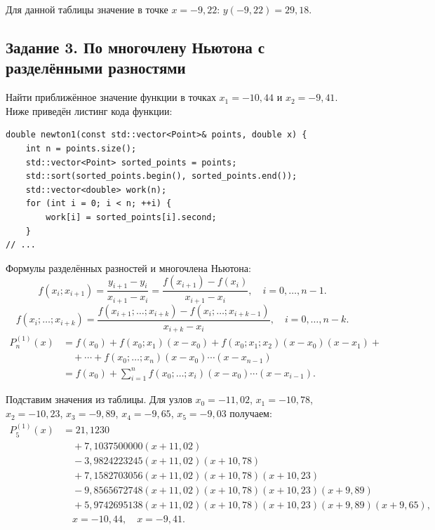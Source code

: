 \documentclass[14pt,a4paper]{extarticle}
\begin{document}
	Для данной таблицы значение в точке $x= -9,22$: $y(-9,22) = 29,18$.
	
	\subsection{Задание 3. По многочлену Ньютона с разделёнными разностями}
	Найти приближённое значение функции в точках $x_1= -10,44$ и $x_2= -9,41$. Ниже приведён листинг кода функции:
	
	\begin{lstlisting}
double newton1(const std::vector<Point>& points, double x) {
	int n = points.size();
	std::vector<Point> sorted_points = points;
	std::sort(sorted_points.begin(), sorted_points.end());
	std::vector<double> work(n);
	for (int i = 0; i < n; ++i) {
		work[i] = sorted_points[i].second;
	}
// ...
	\end{lstlisting}
	
	\noindent Формулы разделённых разностей и многочлена Ньютона:
	\[
		f(x_i;x_{i+1})=\dfrac{y_{i+1}-y_i}{x_{i+1}-x_i}
		=\dfrac{f(x_{i+1})-f(x_i)}{x_{i+1}-x_i},
		\quad i=0,\ldots,n-1.
	\]
	\[
		f(x_i;\ldots;x_{i+k})=
		\dfrac{f(x_{i+1};\ldots;x_{i+k})-f(x_i;\ldots;x_{i+k-1})}{x_{i+k}-x_i},
		\quad i=0,\ldots,n-k.
	\]
	\begingroup\small
	\begin{align*}
		P_n^{(1)}(x)
		&=f(x_0)+f(x_0;x_1)(x-x_0)
		+f(x_0;x_1;x_2)(x-x_0)(x-x_1)+\\
		&\quad+\cdots+f(x_0;\ldots;x_n)(x-x_0)\cdots(x-x_{n-1})\\
		&=f(x_0)+\sum_{i=1}^{n} f(x_0;\ldots;x_i)
		(x-x_0)\cdots(x-x_{i-1}).
	\end{align*}
	\endgroup
	
	\noindent Подставим значения из таблицы. Для узлов $x_0=-11{,}02$, $x_1=-10{,}78$, $x_2=-10{,}23$, $x_3=-9{,}89$, $x_4=-9{,}65$, $x_5=-9{,}03$ получаем:
	\begingroup\scriptsize
	\begin{align*}
		P_5^{(1)}(x)&=21{,}1230\\
		&\quad+7{,}1037500000(x+11{,}02)\\
		&\quad-3{,}9824223245(x+11{,}02)(x+10{,}78)\\
		&\quad+7{,}1582703056(x+11{,}02)(x+10{,}78)(x+10{,}23)\\
		&\quad-9{,}8565672748(x+11{,}02)(x+10{,}78)(x+10{,}23)(x+9{,}89)\\
		&\quad+5{,}9742695138(x+11{,}02)(x+10{,}78)(x+10{,}23)(x+9{,}89)(x+9{,}65),\\
		&\quad x=-10{,}44,\quad x=-9{,}41.
	\end{align*}
	\endgroup
	
\end{document}
